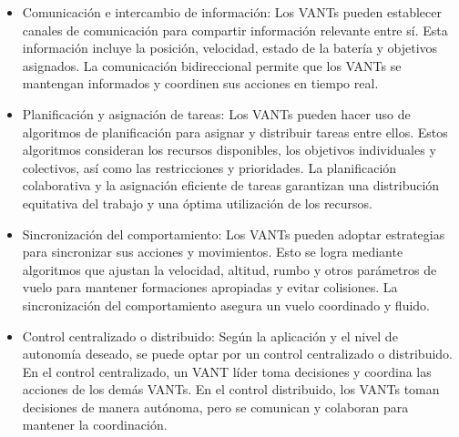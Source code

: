 \documentclass[sigconf]{acmart}
\begin{document}
\begin{itemize}
\item Comunicación e intercambio de información: Los VANTs pueden establecer canales de comunicación para compartir información relevante entre sí. Esta información incluye la posición, velocidad, estado de la batería y objetivos asignados. La comunicación bidireccional permite que los VANTs se mantengan informados y coordinen sus acciones en tiempo real.
\item Planificación y asignación de tareas: Los VANTs pueden hacer uso de algoritmos de planificación para asignar y distribuir tareas entre ellos. Estos algoritmos consideran los recursos disponibles, los objetivos individuales y colectivos, así como las restricciones y prioridades. La planificación colaborativa y la asignación eficiente de tareas garantizan una distribución equitativa del trabajo y una óptima utilización de los recursos.
\item Sincronización del comportamiento: Los VANTs pueden adoptar estrategias para sincronizar sus acciones y movimientos. Esto se logra mediante algoritmos que ajustan la velocidad, altitud, rumbo y otros parámetros de vuelo para mantener formaciones apropiadas y evitar colisiones. La sincronización del comportamiento asegura un vuelo coordinado y fluido.
\item Control centralizado o distribuido: Según la aplicación y el nivel de autonomía deseado, se puede optar por un control centralizado o distribuido. En el control centralizado, un VANT líder toma decisiones y coordina las acciones de los demás VANTs. En el control distribuido, los VANTs toman decisiones de manera autónoma, pero se comunican y colaboran para mantener la coordinación.
\end{itemize}

\end{document}
